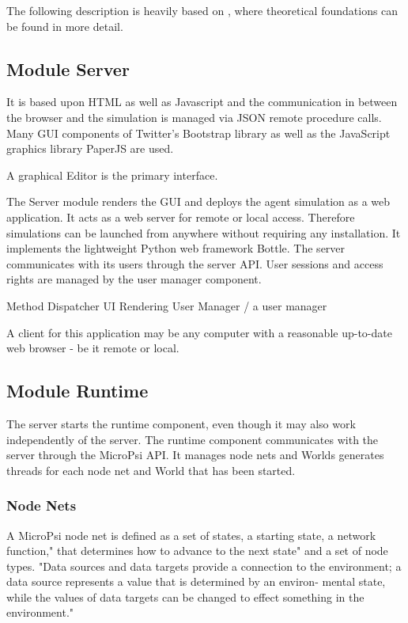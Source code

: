 The following description is heavily based on \cite{conf/agi/Bach12}, where theoretical foundations can be found in more detail.

        \subsection{Module Server}
        It is based upon HTML as well as Javascript and the communication in between the browser and the simulation is managed via JSON remote procedure calls. Many GUI components of Twitter's Bootstrap library as well as the JavaScript graphics library PaperJS are used.
        
        A graphical Editor is the primary interface.
        
The Server module renders the GUI and deploys the agent simulation as a web application. It acts as a web server for remote or local access. Therefore simulations can be launched from anywhere without requiring any installation. It implements the lightweight Python web framework Bottle. The server communicates with its users through the server API. User sessions and access rights are managed by the user manager component. 
    
    Method Dispatcher
    UI Rendering
    User Manager / a user manager
    
A client for this application may be any computer with a reasonable up-to-date web browser - be it remote or local.
 
    
        \subsection{Module Runtime}
The server starts the runtime component, even though it may also work independently of the server. The runtime component communicates with the server through the MicroPsi API. It manages node nets and Worlds generates threads for each node net and World that has been started.

        \subsubsection{Node Nets}
A MicroPsi node net is defined as a set of states, a starting state, a network function," that determines how to advance to the next state" and a set of node types. "Data sources and data targets provide a connection to the environment; a data source represents a value that is determined by an environ- mental state, while the values of data targets can be changed to effect something in the environment."

